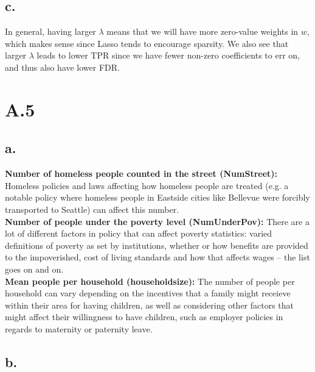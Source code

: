 \documentclass{article}
\newcommand{\1}{\mathbf{1}}
\begin{document}
{\subsection*{c.}

In general, having larger $\lambda$ means that we will have more zero-value weights in $w$, which makes sense since Lasso tends to encourage sparsity. We also see that larger $\lambda$ leads to lower TPR since we have fewer non-zero coefficients to err on, and thus also have lower FDR.

\newpage

}

\section*{A.5}
{\Large 

\subsection*{a.}

\textbf{Number of homeless people counted in the street (NumStreet):} Homeless policies and laws affecting how homeless people are treated (e.g. a notable policy where homeless people in Eastside cities like Bellevue were forcibly transported to Seattle) can affect this number. \\
\textbf{Number of people under the poverty level (NumUnderPov):} There are a lot of different factors in policy that can affect poverty statistics: varied definitions of poverty as set by institutions, whether or how benefits are provided to the impoverished, cost of living standards and how that affects wages -- the list goes on and on. \\
\textbf{Mean people per household (householdsize):} The number of people per household can vary depending on the incentives that a family might receieve within their area for having children, as well as considering other factors that might affect their willingness to have children, such as employer policies in regards to maternity or paternity leave. \\

\subsection*{b.}

}
\end{document}
